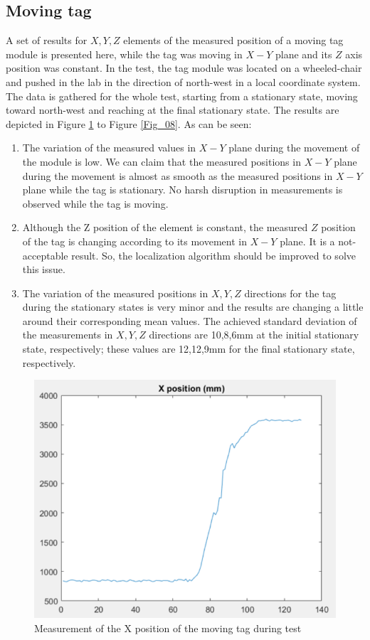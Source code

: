 \documentclass{article}
\begin{document}
\subsection{Moving tag}
A set of results for $X,Y,Z$ elements of the measured position of a moving tag module is presented here, while the tag was moving in $X-Y$ plane and its $Z$ axis position was constant. 
In the test, the tag module was located on a wheeled-chair and pushed in the lab in the direction of north-west in a local coordinate system. The data is gathered for the whole test, starting from a stationary state, moving toward north-west and reaching at the final stationary state. 
The results are depicted in Figure \ref{Fig_06} to Figure \ref{Fig_08}.
As can be seen:
\begin{enumerate}
    \item The variation of the measured values in $X-Y$ plane during the movement of the module is low. We can claim that the measured positions in $X-Y$ plane during the movement is almost as smooth as the measured positions in $X-Y$ plane while the tag is stationary. No harsh disruption in measurements is observed while the tag is moving.
    \item Although the Z position of the element is constant, the measured $Z$ position of the tag is changing according to its movement in $X-Y$ plane. It is a not-acceptable result. So, the localization algorithm should be improved to solve this issue.
    \item The variation of the measured positions in $X,Y,Z$ directions for the tag during the stationary states is very minor and the results are changing a little around their corresponding mean values. The achieved standard deviation of the measurements in $X,Y,Z$ directions are 10,8,6mm at the initial stationary state, respectively; these values are 12,12,9mm for the final stationary state, respectively.
\end{enumerate}
 
\begin{figure}[thpb]
\centering
\includegraphics[scale=0.7]{Pics/Test_MovingTag_X.PNG}
\caption{Measurement of the X position of the moving tag during test}
\label{Fig_06}
\end{figure}
\end{document}
